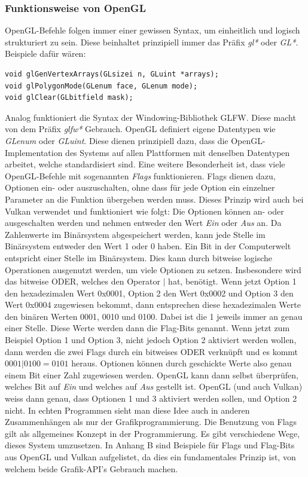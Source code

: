 \documentclass[titlepage, 11pt, a4paper, ngerman]{article}
\begin{document}
\subsubsection{Funktionsweise von OpenGL}
\acrshort{OpenGL}-Befehle folgen immer einer gewissen Syntax, um einheitlich und logisch strukturiert zu sein. Diese beinhaltet prinzipiell immer das Präfix \textit{gl*} oder \textit{GL*}. Beispiele dafür wären: 
\begin{verbatim}
void glGenVertexArrays(GLsizei n, GLuint *arrays);
void glPolygonMode(GLenum face, GLenum mode); 
void glClear(GLbitfield mask);
\end{verbatim}
\bigbreak
Analog funktioniert die Syntax der Windowing-Bibliothek \acrshort{GLFW}. Diese macht von dem Präfix \textit{glfw*} Gebrauch. \acrshort{OpenGL} definiert eigene Datentypen wie \textit{GLenum} oder \textit{GLuint}. Diese dienen prinzipiell dazu, dass die \acrshort{OpenGL}-Implementation des Systems auf allen Plattformen mit denselben Datentypen arbeitet, welche standardisiert sind. Eine weitere Besonderheit ist, dass viele \acrshort{OpenGL}-Befehle mit sogenannten \textit{Flags} funktionieren. Flags dienen dazu, Optionen ein- oder auszuschalten, ohne dass für jede Option ein einzelner Parameter an die Funktion übergeben werden muss. Dieses Prinzip wird auch bei Vulkan verwendet und funktioniert wie folgt: Die Optionen können an- oder ausgeschalten werden und nehmen entweder den Wert \textit{Ein} oder \textit{Aus} an. Da Zahlenwerte im Binärsystem abgespeichert werden, kann jede Stelle im Binärsystem entweder den Wert 1 oder 0 haben. Ein Bit in der Computerwelt entspricht einer Stelle im Binärsystem. Dies kann durch bitweise logische Operationen ausgenutzt werden, um viele Optionen zu setzen. Insbesondere wird das bitweise ODER, welches den Operator $|$ hat, benötigt. Wenn jetzt Option 1 den hexadezimalen Wert 0x0001, Option 2 den Wert 0x0002 und Option 3 den Wert 0x0004 zugewiesen bekommt, dann entsprechen diese hexadezimalen Werte den binären Werten 0001, 0010 und 0100. Dabei ist die 1 jeweils immer an genau einer Stelle. Diese Werte werden dann die Flag-Bits genannt. Wenn jetzt zum Beispiel Option 1 und Option 3, nicht jedoch Option 2 aktiviert werden wollen, dann werden die zwei Flags durch ein bitweises ODER verknüpft und es kommt $0001 | 0100 = 0101$ heraus. Optionen können durch geschickte Werte also genau einem Bit einer Zahl zugewiesen werden. \acrshort{OpenGL} kann dann selbst überprüfen, welches Bit auf \textit{Ein} und welches auf \textit{Aus} gestellt ist. \acrshort{OpenGL} (und auch Vulkan) weiss dann genau, dass Optionen 1 und 3 aktiviert werden sollen, und Option 2 nicht. In echten Programmen sieht man diese Idee auch in anderen Zusammenhängen als nur der Grafikprogrammierung. Die Benutzung von Flags gilt als allgemeines Konzept in der Programmierung. Es gibt verschiedene Wege, dieses System umzusetzen. In Anhang B sind Beispiele für Flags und Flag-Bits aus \acrshort{OpenGL} und Vulkan aufgelistet, da dies ein fundamentales Prinzip ist, von welchem beide Grafik-\acrshort{API}'s Gebrauch machen.\par
\end{document}
